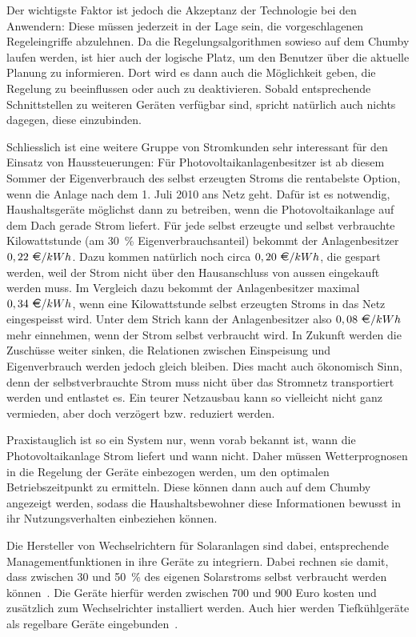 \documentclass[logo]{fhgart}
\newcommand*\euro{\textup{\EUR}}
\begin{document}
Der wichtigste Faktor ist jedoch die Akzeptanz der Technologie bei den
Anwendern: Diese müssen jederzeit in der Lage sein, die vorgeschlagenen
Regeleingriffe abzulehnen. Da die Regelungsalgorithmen sowieso auf dem
Chumby laufen werden, ist hier auch der logische Platz, um den Benutzer
über die aktuelle Planung zu informieren. Dort wird es dann auch die
Möglichkeit geben, die Regelung zu beeinflussen oder auch zu
deaktivieren. Sobald entsprechende Schnittstellen zu weiteren Geräten
verfügbar sind, spricht natürlich auch nichts dagegen, diese
einzubinden.

Schliesslich ist eine weitere Gruppe von Stromkunden sehr interessant
für den Einsatz von Haussteuerungen: Für Photovoltaikanlagenbesitzer ist
ab diesem Sommer der Eigenverbrauch des selbst erzeugten Stroms die
rentabelste Option, wenn die Anlage nach dem 1. Juli 2010 ans Netz geht.
Dafür ist es notwendig, Haushaltsgeräte möglichst dann zu betreiben,
wenn die Photovoltaikanlage auf dem Dach gerade Strom liefert. Für jede
selbst erzeugte und selbst verbrauchte Kilowattstunde (am 30~\%
Eigenverbrauchsanteil) bekommt der Anlagenbesitzer $0,22~{\euro}/{kWh}$.  Dazu
kommen natürlich noch circa $0,20~{\euro}/{kWh}$, die gespart werden, weil der
Strom nicht über den Hausanschluss von aussen eingekauft werden muss. Im
Vergleich dazu bekommt der Anlagenbesitzer maximal $0,34~{\euro}/{kWh}$, wenn
eine Kilowattstunde selbst erzeugten Stroms in das Netz eingespeisst
wird.  Unter dem Strich kann der Anlagenbesitzer also $0,08
~{\euro}/{kWh}$ mehr
einnehmen, wenn der Strom selbst verbraucht wird. In Zukunft werden die
Zuschüsse weiter sinken, die Relationen zwischen Einspeisung und
Eigenverbrauch werden jedoch gleich bleiben. Dies macht auch ökonomisch
Sinn, denn der selbstverbrauchte Strom muss nicht über das Stromnetz
transportiert werden und entlastet es. Ein teurer Netzausbau kann so
vielleicht nicht ganz vermieden, aber doch verzögert bzw.  reduziert
werden.

Praxistauglich ist so ein System nur, wenn vorab bekannt ist, wann die
Photovoltaikanlage Strom liefert und wann nicht. Daher müssen
Wetterprognosen in die Regelung der Geräte einbezogen werden, um den
optimalen Betriebszeitpunkt zu ermitteln. Diese können dann auch auf dem
Chumby angezeigt werden, sodass die Haushaltsbewohner diese
Informationen bewusst in ihr Nutzungsverhalten einbeziehen können.

Die Hersteller von Wechselrichtern für Solaranlagen sind dabei,
entsprechende Managementfunktionen in ihre Geräte zu integriern. Dabei
rechnen sie damit, dass zwischen 30 und 50~\% des eigenen Solarstroms
selbst verbraucht werden können~\cite{ossenbrinck10herstellung}. Die
Geräte hierfür werden zwischen 700 und 900 Euro kosten und zusätzlich
zum Wechselrichter installiert werden. Auch hier werden Tiefkühlgeräte
als regelbare Geräte eingebunden~\cite{ossenbrinck10herstellung}.
\end{document}
